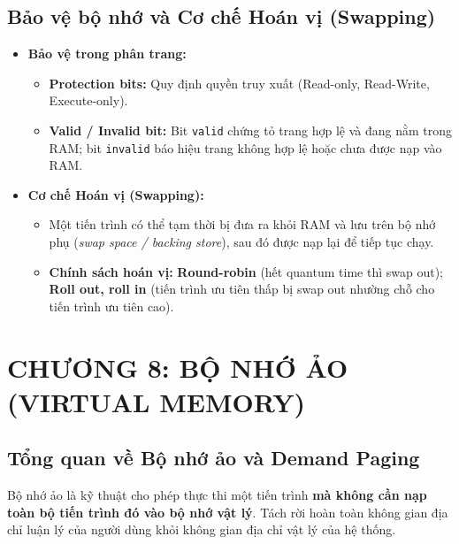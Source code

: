 \documentclass[11pt,a4paper]{article}
\begin{document}
\subsection{Bảo vệ bộ nhớ và Cơ chế Hoán vị (Swapping)}
\begin{itemize}
    \item \textbf{Bảo vệ trong phân trang:}
    \begin{itemize}[noitemsep]
        \item \textbf{Protection bits:} Quy định quyền truy xuất (Read-only, Read-Write, Execute-only).
        \item \textbf{Valid / Invalid bit:} Bit \texttt{valid} chứng tỏ trang hợp lệ và đang nằm trong RAM; bit \texttt{invalid} báo hiệu trang không hợp lệ hoặc chưa được nạp vào RAM.
    \end{itemize}
    \item \textbf{Cơ chế Hoán vị (Swapping):}
    \begin{itemize}[noitemsep]
        \item Một tiến trình có thể tạm thời bị đưa ra khỏi RAM và lưu trên bộ nhớ phụ (\textit{swap space / backing store}), sau đó được nạp lại để tiếp tục chạy.
        \item \textbf{Chính sách hoán vị:} \textbf{Round-robin} (hết quantum time thì swap out); \textbf{Roll out, roll in} (tiến trình ưu tiên thấp bị swap out nhường chỗ cho tiến trình ưu tiên cao).
    \end{itemize}
\end{itemize}

\newpage
\section{CHƯƠNG 8: BỘ NHỚ ẢO (VIRTUAL MEMORY)}

\subsection{Tổng quan về Bộ nhớ ảo và Demand Paging}
\begin{summarybox}
Bộ nhớ ảo là kỹ thuật cho phép thực thi một tiến trình \textbf{mà không cần nạp toàn bộ tiến trình đó vào bộ nhớ vật lý}. Tách rời hoàn toàn không gian địa chỉ luận lý của người dùng khỏi không gian địa chỉ vật lý của hệ thống.
\end{summarybox}
\end{document}
